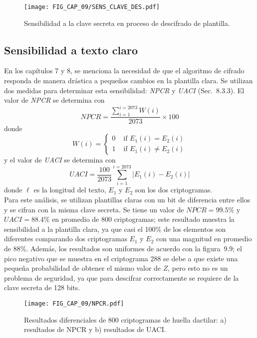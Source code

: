 \begin{figure}[!htbp] %
	\center
	\texttt{[image: FIG\_CAP\_09/SENS\_CLAVE\_DES.pdf]}      
	\caption{Sensibilidad a la clave secreta en proceso de descifrado de plantilla.}
\end{figure}

\subsection{Sensibilidad a texto claro}
En los capítulos 7 y 8, se menciona la necesidad de que el algoritmo de cifrado responda de manera drástica a pequeños cambios en la plantilla clara. Se utilizan dos medidas para determinar esta sensibilidad: \textit{NPCR} y \textit{UACI} (Sec.~8.3.3). El valor de \textit{NPCR} se determina con
\begin{equation}
NPCR=\frac{\sum_{i=1}^{i=2073}W(i)}{2073} \times 100
\end{equation}
donde
\begin{equation}
W(i) = \left\{ \begin{array}{rl}
 0 &\mbox{ if $E_{1}(i)=E_{2}(i)$} \\
 1 &\mbox{ if $E_{1}(i)\neq E_{2}(i)$}
       \end{array} \right.
\end{equation}  
y el valor de \textit{UACI} se determina con
\begin{equation}
UACI=\frac{100}{2073}\sum_{i=1}^{i=2073}|E_{1}(i)-E_{2}(i)|
\end{equation}
donde $\ell$ es la longitud del texto, $E_{1}$ y $E_{2}$ son los dos criptogramas.  \\

Para este análisis, se utilizan plantillas claras con un bit de diferencia entre ellos y se cifran con la misma clave secreta. Se tiene un valor de $NPCR=99.5\%$ y $UACI=88.4\%$ en promedio de 800 criptogramas; este resultado muestra la sensibilidad a la plantilla clara, ya que casi el 100\% de los elementos son diferentes comparando dos criptogramas $E_{1}$ y $E_{2}$ con una magnitud en promedio de 88\%. Además, los resultados son uniformes de acuerdo con la figura~9.9; el pico negativo que se muestra en el criptograma 288 se debe a que existe una pequeña probabilidad de obtener el mismo valor de $Z$, pero esto no es un problema de seguridad, ya que para descifrar correctamente se requiere de la clave secreta de 128 bits.  

\begin{figure}[!htbp] %
	\center
	\texttt{[image: FIG\_CAP\_09/NPCR.pdf]}   
	\caption{Resultados diferenciales de 800 criptogramas de huella dactilar: a) resultados de NPCR y b) resultados de UACI.}
\end{figure}

